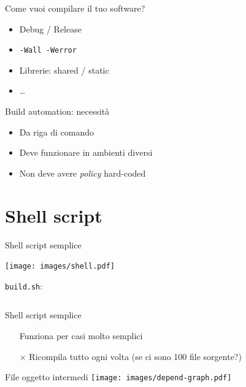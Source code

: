 \documentclass[xetex,table]{beamer}
\begin{document}
\begin{frame}{Come vuoi compilare il tuo software?}
  \begin{itemize}
  \item Debug / Release
  \item \texttt{-Wall -Werror}
  \item Librerie: shared / static
  \item \dots
  \end{itemize}
\end{frame}

\begin{frame}{Build automation: necessità}
  \begin{itemize}
  \item Da riga di comando
  \item Deve funzionare in ambienti diversi
  \item Non deve avere {\em policy} hard-coded
  \end{itemize}
\end{frame}

\section{Shell script}


\begin{frame}[fragile]{Shell script semplice}
  \begin{center}
  \texttt{[image: images/shell.pdf]}
  \end{center}

  \texttt{build.sh}:

  \inputminted[bgcolor=codebackground,frame=single]{shell}{examples/1-shell-1/build.sh}
\end{frame}

\begin{frame}{Shell script semplice}
  \begin{itemize}
  \item[\checkmark] Funziona per casi molto semplici
  \item[$\times$]   Ricompila tutto ogni volta (se ci sono 100 file sorgente?)
  \end{itemize}
\end{frame}

\begin{frame}{File oggetto intermedi}
  \center\texttt{[image: images/depend-graph.pdf]}
\end{frame}
\end{document}
